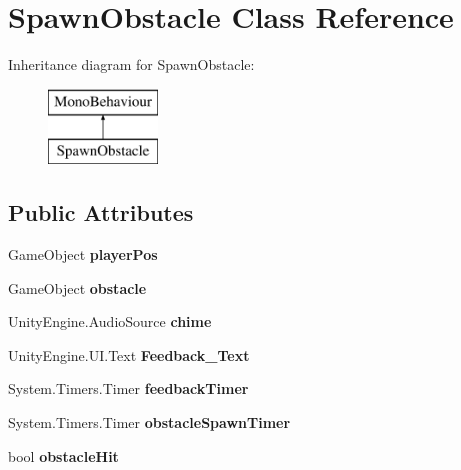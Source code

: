 \hypertarget{class_spawn_obstacle}{}\section{Spawn\+Obstacle Class Reference}
\label{class_spawn_obstacle}
Inheritance diagram for Spawn\+Obstacle\+:\begin{figure}[H]
\begin{center}
\leavevmode
\includegraphics[height=2.000000cm]{class_spawn_obstacle}
\end{center}
\end{figure}
\subsection*{Public Attributes}
\begin{DoxyCompactItemize}
\item 
\mbox{\label{class_spawn_obstacle_a188c266348b667f86dda7972d8be0530}} 
Game\+Object {\bfseries player\+Pos}
\item 
\mbox{\label{class_spawn_obstacle_aaface08251917fffdeef322ffc2d0ad3}} 
Game\+Object {\bfseries obstacle}
\item 
\mbox{\label{class_spawn_obstacle_aa79793ef4057e90a9b9ce9ea7e8c28ee}} 
Unity\+Engine.\+Audio\+Source {\bfseries chime}
\item 
\mbox{\label{class_spawn_obstacle_a8454fe701058226c6bec47223333e5d3}} 
Unity\+Engine.\+U\+I.\+Text {\bfseries Feedback\+\_\+\+Text}
\item 
\mbox{\label{class_spawn_obstacle_a398c6a655c82015acdbe6bd070ad8a55}} 
System.\+Timers.\+Timer {\bfseries feedback\+Timer}
\item 
\mbox{\label{class_spawn_obstacle_a17a688a0a99907b1295be2700035dcff}} 
System.\+Timers.\+Timer {\bfseries obstacle\+Spawn\+Timer}
\item 
\mbox{\label{class_spawn_obstacle_a065f47a785a616e28055e80500d4e95f}} 
bool {\bfseries obstacle\+Hit}
\end{DoxyCompactItemize}
